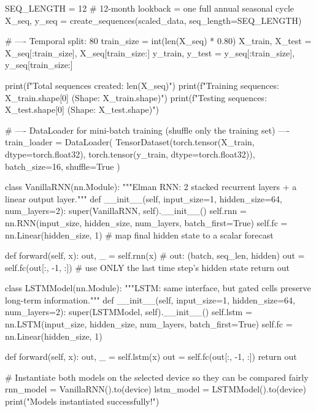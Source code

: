 \begin{codebox}[title={Core numerical and plotting libraries}]
SEQ_LENGTH = 12  # 12-month lookback = one full annual seasonal cycle
X_seq, y_seq = create_sequences(scaled_data, seq_length=SEQ_LENGTH)

# ---- Temporal split: 80%
train_size = int(len(X_seq) * 0.80)
X_train, X_test = X_seq[:train_size], X_seq[train_size:]
y_train, y_test = y_seq[:train_size], y_seq[train_size:]

print(f"Total sequences created: {len(X_seq)}")
print(f"Training sequences:      {X_train.shape[0]} (Shape: {X_train.shape})")
print(f"Testing sequences:       {X_test.shape[0]}  (Shape: {X_test.shape})")

# ---- DataLoader for mini-batch training (shuffle only the training set) ----
train_loader = DataLoader(
    TensorDataset(torch.tensor(X_train, dtype=torch.float32), torch.tensor(y_train, dtype=torch.float32)),
    batch_size=16,
    shuffle=True
)
\end{codebox}

\begin{codebox}[title={Vanilla RNN and LSTM model definitions}]
class VanillaRNN(nn.Module):
    """Elman RNN: 2 stacked recurrent layers + a linear output layer."""
    def __init__(self, input_size=1, hidden_size=64, num_layers=2):
        super(VanillaRNN, self).__init__()
        self.rnn = nn.RNN(input_size, hidden_size, num_layers, batch_first=True)
        self.fc = nn.Linear(hidden_size, 1)   # map final hidden state to a scalar forecast

    def forward(self, x):
        out, _ = self.rnn(x)                 # out: (batch, seq_len, hidden)
        out = self.fc(out[:, -1, :])         # use ONLY the last time step's hidden state
        return out

class LSTMModel(nn.Module):
    """LSTM: same interface, but gated cells preserve long-term information."""
    def __init__(self, input_size=1, hidden_size=64, num_layers=2):
        super(LSTMModel, self).__init__()
        self.lstm = nn.LSTM(input_size, hidden_size, num_layers, batch_first=True)
        self.fc = nn.Linear(hidden_size, 1)

    def forward(self, x):
        out, _ = self.lstm(x)
        out = self.fc(out[:, -1, :])
        return out

# Instantiate both models on the selected device so they can be compared fairly
rnn_model = VanillaRNN().to(device)
lstm_model = LSTMModel().to(device)
print("Models instantiated successfully!")
\end{codebox}

